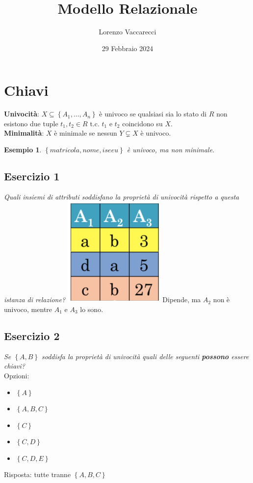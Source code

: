 \documentclass[12pt]{article}
\title{Modello Relazionale}
\author{Lorenzo Vaccarecci}
\date{29 Febbraio 2024}
\newtheorem{example}{Esempio}
\begin{document}
\maketitle
\section{Chiavi}
\textbf{Univocità}: \(X \subseteq \left\{A_{1}, \dots, A_{n}\right\}\) è univoco se qualsiasi sia lo stato di \(R\) non esistono due tuple \(t_{1},t_{2} \in R\) t.c. \(t_{1} \text{ e } t_{2}\) coincidono su \(X\).\\
\textbf{Minimalità}: \(X\) è minimale se nessun \(Y \subsetneq  X\) è univoco.
\begin{example}
    \(\left\{matricola,nome,iseeu\right\}\) è univoco, ma non minimale.
\end{example}
\subsection{Esercizio 1}
\textit{Quali insiemi di attributi soddisfano la proprietà di univocità rispetto a questa istanza di relazione?}
\includegraphics[width=5cm]{esercizio2.png}
Dipende, ma \(A_{2}\) non è univoco, mentre \(A_{1}\) e \(A_{3}\) lo sono.
\subsection{Esercizio 2}
\textit{Se \(\left\{A,B\right\}\) soddisfa la proprietà di univocità quali delle seguenti \textbf{possono} essere chiavi?}\\
Opzioni:
\begin{itemize}
    \setlength\itemsep{0em} 
    \item \(\left\{A\right\}\)
    \item \(\left\{A,B,C\right\}\)
    \item \(\left\{C\right\}\)
    \item \(\left\{C,D\right\}\)
    \item \(\left\{C,D,E\right\}\)
\end{itemize}
Risposta: tutte tranne \(\left\{A,B,C\right\}\)
\end{document}
